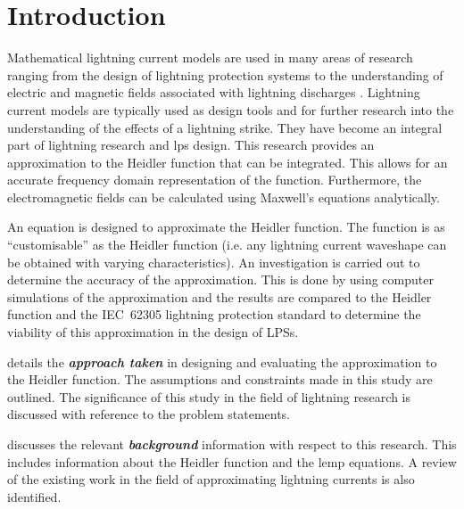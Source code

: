 
\chapter{Introduction} %

\label{ChapterIntro} %


Mathematical lightning current models are used in many areas of research ranging from the design of lightning protection systems to the understanding of electric and magnetic fields associated with lightning discharges \cite{IEC623051, ZhangFeizhouandLiuShanghe2002}.
Lightning current models are typically used as design tools and for further research into the understanding of the effects of a lightning strike.
They have become an integral part of lightning research and \gls{lps} design.
This research provides an approximation to the Heidler function that can be integrated. This allows for an accurate frequency domain representation of the function. Furthermore, the electromagnetic fields can be calculated using Maxwell's equations analytically.

An equation is designed to approximate the Heidler function. The function is as ``customisable'' as the Heidler function (i.e. any lightning current waveshape can be obtained with varying characteristics).
An investigation is carried out to determine the accuracy of the approximation. This is done by using computer simulations of the approximation and the results are compared to the Heidler function and the IEC~62305 lightning protection standard to determine the viability of this approximation in the design of LPSs.

 details the \textbf{\textit{approach taken}} in designing and evaluating the approximation to the Heidler function. The assumptions and constraints made in this study are outlined. The significance of this study in the field of lightning research is discussed with reference to the problem statements.

 discusses the relevant \textbf{\textit{background}} information with respect to this research. This includes information about the Heidler function and the \gls{lemp} equations. A review of the existing work in the field of approximating lightning currents is also identified.

